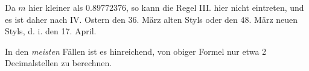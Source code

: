 Da $m$ hier kleiner als $0.89772376$, so kann die Regel III. hier nicht eintreten,
und es ist daher nach IV. Ostern den 36. März alten Styls oder den
48. März neuen Styls, d. i. den 17. April.

In den \textit{meisten} Fällen ist es hinreichend, von obiger Formel nur etwa 2
Decimalstellen zu berechnen.

\par\nobreak\medskip
\noindent\makebox[\linewidth][c]{\rule{.255\linewidth}{.3pt}}\par
{}
\par\clearpage
\endgroup
